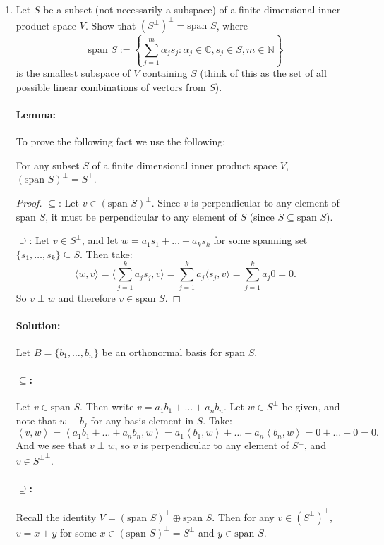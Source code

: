 \documentclass{article}
\begin{document}
\begin{enumerate}
    
\item Let $S$ be a subset (not necessarily a subspace) of a finite dimensional inner product space $V$. Show that $(S^\perp)^\perp = \text{span } S$, where
$$\text{span } S := \left\{\sum_{j=1}^m \alpha_j s_j : \alpha_j \in \mathbb{C}, s_j \in S, m \in \mathbb{N}\right\}$$
is the smallest subspace of $V$ containing $S$ (think of this as the set of all possible linear combinations of vectors from $S$).
\paragraph{Lemma:} To prove the following fact we use the following:

For any subset $S$ of a finite dimensional inner product space $V$, $(\text{span }S)^{\perp}=S^{\perp}$.
\begin{proof} 
    

{$\subseteq $:}  Let $v\in (\text{span }S )^{\perp}$. Since $v$ is perpendicular to any element of $\text{span }S$, it must be perpendicular to any element of $S$ (since $S\subseteq \text{span }S$).

{$\supseteq$:} Let $v\in S^{\perp}$, and let $w=a_1s_1+\dots+a_ks_k$ for some spanning set $\{s_1,\dots,s_k\} \subseteq S$. Then take:
\[ \langle w,v \rangle = \langle \sum_{j=1}^{k} a_js_j,v \rangle=\sum_{j=1}^{k} a_j\langle s_j,v \rangle=\sum_{j=1}^{k} a_j0=0 .\] 
So $v\perp w$ and therefore $v\in \text{span }S$.
\end{proof}
\paragraph{Solution: }

Let $B=\{b_1,\dots,b_n\} $ be an orthonormal basis for $\text{span } S$.

\paragraph{$\subseteq $:} Let $v\in \text{span }S$. Then write $v=a_1b_1+\dots+a_nb_n$. Let $w\in S^{\perp}$ be given, and note that $w\perp b_j$ for any basis element in $S$. Take:
\[ \left<v,w \right> =  \left< a_1b_1+\dots+a_nb_n,w\right> = a_1\left< b_1,w\right>+\dots+a_n\left<b_n ,w\right> =  0+\dots+0=0 .\] 
And we see that $v\perp w$, so $v$ is perpendicular to any element of $S^{\perp}$, and $v\in {S^{\perp}}^{\perp}$.
\paragraph{$\supseteq $:} Recall the identity $V=(\text{span } S)^{\perp}\oplus  \text{span }S$. Then for any $v\in(S^{\perp})^{\perp}$, $v=x+y$ for some  $x\in (\text{span }S)^{\perp}=S^{\perp}$ and $y\in \text{span } S$.


\end{enumerate}
\end{document}
